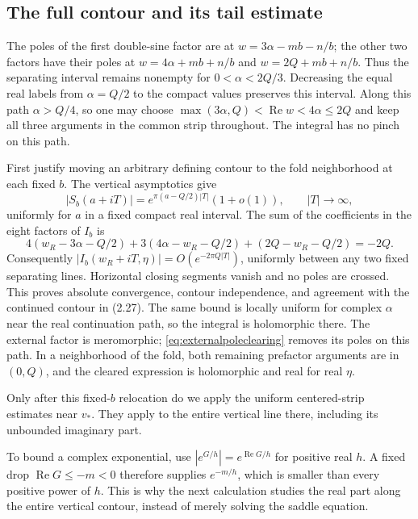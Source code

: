 \subsection{The full contour and its tail estimate}

The poles of the first double-sine factor are at
$w=3\alpha-mb-n/b$; the other two factors have their poles
at $w=4\alpha+mb+n/b$ and $w=2Q+mb+n/b$.
Thus the separating interval remains nonempty for
$0<\alpha<2Q/3$. Decreasing the equal real labels from
$\alpha=Q/2$ to the compact values preserves this interval.
Along this path $\alpha>Q/4$, so one may choose
$\max(3\alpha,Q)<\operatorname{Re}w<4\alpha\le2Q$ and keep
all three arguments in the common strip throughout.
The integral has no pinch on this path.

First justify moving an arbitrary defining contour to the fold
neighborhood at each fixed $b$. The vertical asymptotics
\cite[(A.11) and (A.13)]{TeschnerVartanov} give
\[
 |S_b(a+iT)|=e^{\pi(a-Q/2)|T|}(1+o(1)),\qquad |T|\to\infty,
\]
uniformly for $a$ in a fixed compact real interval. The sum of
the coefficients in the eight factors of $I_b$ is
\[
 4(w_R-3\alpha-Q/2)+3(4\alpha-w_R-Q/2)
                       +(2Q-w_R-Q/2)=-2Q.
\]
Consequently $|I_b(w_R+iT,\eta)|=O(e^{-2\pi Q|T|})$,
uniformly between any two fixed separating lines. Horizontal
closing segments vanish and no poles are crossed. This proves
absolute convergence, contour independence, and agreement with
the continued contour in (2.27). The same bound is locally
uniform for complex $\alpha$ near the real continuation path,
so the integral is holomorphic there. The external factor is
meromorphic; \eqref{eq:externalpoleclearing} removes its poles
on this path. In a neighborhood of the fold, both remaining
prefactor arguments are in $(0,Q)$, and the cleared expression
is holomorphic and real for real $\eta$.

Only after this fixed-$b$ relocation do we apply the uniform
centered-strip estimates near $v_*$. They apply to the entire
vertical line there, including its unbounded imaginary part.

To bound a complex exponential, use
$|e^{G/h}|=e^{\operatorname{Re}G/h}$ for positive real $h$.
A fixed drop $\operatorname{Re}G\le -m<0$ therefore supplies
$e^{-m/h}$, which is smaller than every positive power of $h$.
This is why the next calculation studies the real part along the
entire vertical contour, instead of merely solving the saddle equation.

